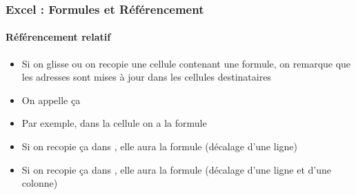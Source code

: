 \documentclass[xcolor=table, usenames,dvipsnames]{beamer}
\begin{document}
\begin{frame}
\frametitle{Excel : Formules et Référencement}
\framesubtitle{Référencement relatif}

\begin{minipage}{0.40\textwidth}
	\begin{itemize}
		\item Si on glisse ou on recopie une cellule contenant une formule, on remarque que les adresses sont mises à jour dans les cellules destinataires
	\end{itemize}
\end{minipage}
%
\begin{minipage}{0.59\textwidth}
\end{minipage}

\begin{itemize}
	\item On appelle ça 
	\item Par exemple, dans la cellule  on a la formule 
	\item Si on recopie ça dans , elle aura la formule  (décalage d'une ligne)
	\item Si on recopie ça dans , elle aura la formule  (décalage d'une ligne et d'une colonne)
\end{itemize}

\end{frame}
\end{document}
